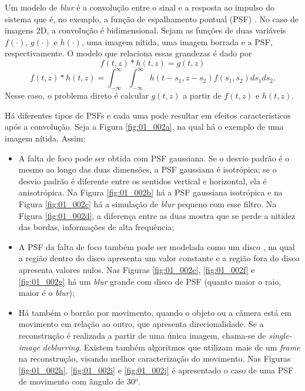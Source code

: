 Um modelo de \textit{blur} é a convolução entre o sinal e a resposta ao impulso do sistema que é, no exemplo, a função de espalhamento pontual (PSF) \cite{hansen2006deblurring}. No caso de imagens 2D, a convolução é bidimensional. Sejam as funções de duas variáveis $f(\cdot)$, $g(\cdot)$  e $h(\cdot)$, uma imagem nítida, uma imagem borrada e a PSF, respectivamente. O modelo \cite[págs. 167]{aster2019parameter} que relaciona essas grandezas é dado por
\begin{equation}
f(t,z)*h(t,z) = g(t,z)
\label{eq:convdisc1}
\end{equation}
\begin{equation}
f(t,z) * h(t,z) = \int_{- \infty}^\infty \int_{- \infty}^\infty h(t-s_1, z-s_2) f(s_1, s_2) ds_1 ds_2.
\label{eq:blur}
\end{equation}
Nesse caso, o problema direto é calcular $g(t,z)$ a partir de $f(t,z)$ e $h(t,z)$. 

Há diferentes tipos de PSFs e cada uma pode resultar em efeitos característicos após a convolução. Seja a Figura \ref{fig:01_002a}, na qual há o exemplo de uma imagem nítida. Assim:
\begin{itemize}
\item A falta de foco pode ser obtida com PSF gaussiana. Se o desvio padrão é o mesmo ao longo das duas dimensões, a PSF gaussiana é isotrópica; se o desvio padrão é diferente entre os sentidos vertical e horizontal, ela é anisotrópica. Na Figura \ref{fig:01_002b} há a PSF gaussiana isotrópica e na Figura  \ref{fig:01_002c} há a simulação de \textit{blur} pequeno com esse filtro. Na Figura \ref{fig:01_002d}, a diferença entre as duas mostra que se perde a nitidez das bordas, informações de alta frequência;


\item A PSF da falta de foco também pode ser modelada como um disco \cite[págs. 25-6]{hansen2006deblurring}, na qual a região dentro do disco apresenta um valor constante e a região fora do disco apresenta valores nulos. Nas Figuras \ref{fig:01_002e}, \ref{fig:01_002f} e \ref{fig:01_002g} há um \textit{blur} grande com disco de PSF (quanto maior o raio, maior é o \textit{blur});


\item Há também o borrão por movimento, quando o objeto ou a câmera está em movimento em relação ao outro, que apresenta direcionalidade. 
Se a reconstrução é realizada a partir de uma única imagem, chama-se de \textit{single-image deblurring}. Existem também algoritmos que utilizam mais de um \textit{frame} na reconstrução, visando melhor caracterização do movimento. Nas Figuras \ref{fig:01_002h}, \ref{fig:01_002i} e \ref{fig:01_002j} é apresentado o caso de uma PSF de movimento com ângulo de 30$^o$. 
\end{itemize}


